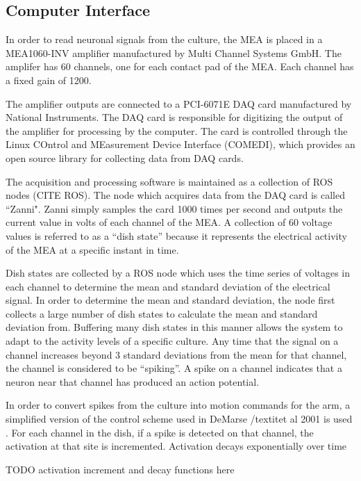 \documentclass[letterpaper]{article}
\begin{document}
\subsection{Computer Interface}

In order to read neuronal signals from the culture, the MEA is placed in a MEA1060-INV amplifier manufactured by Multi Channel Systems GmbH. 
The amplifer has 60 channels, one for each contact pad of the MEA.
Each channel has a fixed gain of 1200.

The amplifier outputs are connected to a PCI-6071E DAQ card manufactured by National Instruments. 
The DAQ card is responsible for digitizing the output of the amplifier for processing by the computer. 
The card is controlled through the Linux COntrol and MEasurement Device Interface (COMEDI), which provides an open source library for collecting data from DAQ cards. 

The acquisition and processing software is maintained as a collection of ROS nodes (CITE ROS).
The node which acquires data from the DAQ card is called ``Zanni". 
Zanni simply samples the card 1000 times per second and outputs the current value in volts of each channel of the MEA. 
A collection of 60 voltage values is referred to as a ``dish state'' because it represents the electrical activity of the MEA at a specific instant in time. 

Dish states are collected by a ROS node which uses the time series of voltages in each channel to determine the mean and standard deviation of the electrical signal. 
In order to determine the mean and standard deviation, the node first collects a large number of dish states to calculate the mean and standard deviation from. 
Buffering many dish states in this manner allows the system to adapt to the activity levels of a specific culture. 
Any time that the signal on a channel increases beyond 3 standard deviations from the mean for that channel, the channel is considered to be ``spiking''. 
A spike on a channel indicates that a neuron near that channel has produced an action potential. 

In order to convert spikes from the culture into motion commands for the arm, a simplified version of the control scheme used in DeMarse /textit{et al} 2001 is used \cite{demarse2001neurally}. 
For each channel in the dish, if a spike is detected on that channel, the activation at that site is incremented. 
Activation decays exponentially over time 

TODO activation increment and decay functions here
\end{document}
